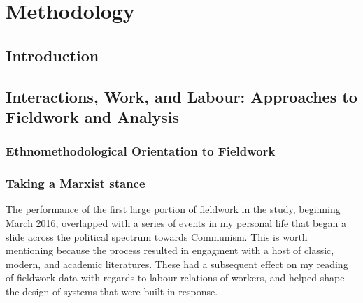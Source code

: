 \chapter{Methodology}
\label{sec:method}

\section{Introduction}
%
%
%
%


\section{Interactions, Work, and Labour: Approaches to Fieldwork and Analysis}
\label{sec:method:fieldwork}




\subsection{Ethnomethodological Orientation to Fieldwork}

\subsection{Taking a Marxist stance}

The performance of the first large portion of fieldwork in the study, beginning March 2016, overlapped with a series of events in my personal life that began a slide across the political spectrum towards Communism. This is worth mentioning because the process resulted in engagment with a host of classic, modern, and academic literatures. These had a subsequent effect on my reading of fieldwork data with regards to labour relations of workers, and helped shape the design of systems that were built in response.


